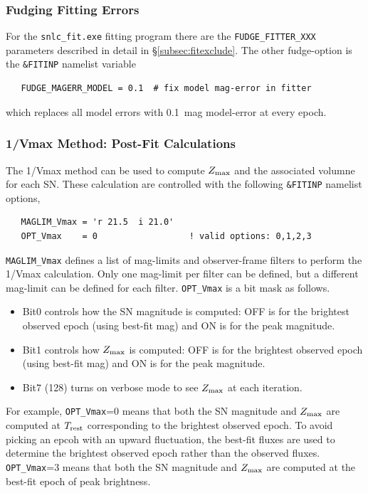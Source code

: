 \documentclass[12pt]{article}
\newcommand{\Trest}{T_{\rm rest}}
\newcommand{\zmax}{Z_{\rm max}}
\begin{document}
  \subsubsection{Fudging Fitting Errors}
  \label{sss:fudge_fit_errors}


For the {\tt snlc\_fit.exe} fitting program there are the 
{\tt FUDGE\_FITTER\_XXX} parameters described in detail in 
\S\ref{subsec:fitexclude}.
The other fudge-option is the {\tt \&FITINP} namelist  variable
\begin{verbatim}
   FUDGE_MAGERR_MODEL = 0.1  # fix model mag-error in fitter
\end{verbatim}
%
which replaces all model errors  with 0.1~mag model-error
at every epoch.



 \clearpage
  \subsubsection{1/Vmax Method: Post-Fit Calculations}
  \label{sss:Vmax}

The 1/Vmax method can be used to compute $\zmax$ and the
associated volumne for each SN.
These calculation are controlled with the
following {\tt \&FITINP} namelist options,
%
\begin{verbatim}
   MAGLIM_Vmax = 'r 21.5  i 21.0'
   OPT_Vmax    = 0                  ! valid options: 0,1,2,3
\end{verbatim}
%
{\tt MAGLIM\_Vmax} defines a list of mag-limits and 
observer-frame filters to perform the 1/Vmax calculation. 
Only one mag-limit per filter can be defined, 
but a different mag-limit can be defined for each filter.
{\tt OPT\_Vmax} is a bit mask as follows.
\begin{itemize}
  \item Bit0 controls how the SN magnitude is computed:
        OFF is for the brightest observed epoch (using best-fit mag)
        and ON is for the peak magnitude.
  \item Bit1 controls how $\zmax$ is computed:
        OFF is for the brightest observed epoch (using best-fit mag)
        and ON is for the peak magnitude.
  \item Bit7 (128) turns on verbose mode to see $\zmax$ at each iteration.
\end{itemize}
% 
For example, {\tt OPT\_Vmax}=0 means that both the SN magnitude 
and $\zmax$ are computed at $\Trest$ corresponding to the
brightest observed epoch. To avoid picking an epcoh with
an upward fluctuation, the best-fit fluxes are used to determine
the brightest observed epoch rather than the observed fluxes.
{\tt OPT\_Vmax}=3 means that both the SN magnitude and $\zmax$
are computed at the best-fit epoch of peak brightness.
\end{document}
